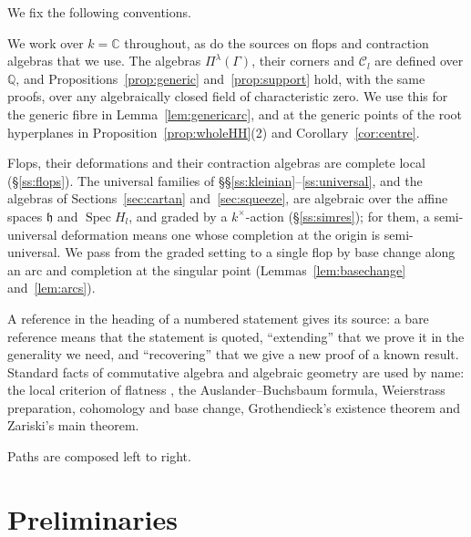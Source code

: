 \documentclass[11pt]{amsart}
\makeatletter
\numberwithin{table}{section}
\numberwithin{figure}{section}
\numberwithin{equation}{section}
\theoremstyle{definition}
\theoremstyle{plain}
\newcommand{\cC}{\mathcal{C}}
\newcommand{\h}{\mathfrak{h}}
\newcommand{\Q}{\mathbb{Q}}
\newcommand{\C}{\mathbb{C}}
\DeclareMathOperator{\Spec}{Spec}
\renewcommand\paragraph{\@startsection{paragraph}{4}{\z@}{\medskipamount}{-.5em}{\normalfont\bfseries}}
\makeatother
\begin{document}
\paragraph{Conventions.} We fix the following conventions.
\begin{description}[leftmargin=0pt, itemsep=3pt, font=\normalfont\itshape]
\item[Base field] We work over $k = \C$ throughout, as do the sources on flops and contraction algebras that we use. The algebras $\Pi^\lambda(\Gamma)$, their corners and $\cC_l$ are defined over $\Q$, and Propositions~\ref{prop:generic} and~\ref{prop:support} hold, with the same proofs, over any algebraically closed field of characteristic zero. We use this for the generic fibre in Lemma~\ref{lem:genericarc}, and at the generic points of the root hyperplanes in Proposition~\ref{prop:wholeHH}(2) and Corollary~\ref{cor:centre}.
\item[Local and graded settings] Flops, their deformations and their contraction algebras are complete local (\S\ref{ss:flops}). The universal families of \S\S\ref{ss:kleinian}--\ref{ss:universal}, and the algebras of Sections~\ref{sec:cartan} and~\ref{sec:squeeze}, are algebraic over the affine spaces $\h$ and $\Spec H_l$, and graded by a $k^\times$-action (\S\ref{ss:simres}); for them, a semi-universal deformation means one whose completion at the origin is semi-universal. We pass from the graded setting to a single flop by base change along an arc and completion at the singular point (Lemmas~\ref{lem:basechange} and~\ref{lem:arcs}).
\item[References] A reference in the heading of a numbered statement gives its source: a bare reference means that the statement is quoted, ``extending'' that we prove it in the generality we need, and ``recovering'' that we give a new proof of a known result. Standard facts of commutative algebra and algebraic geometry are used by name: the local criterion of flatness \cite[Thm~22.3]{Mat}, the Auslander--Buchsbaum formula, Weierstrass preparation, cohomology and base change, Grothendieck's existence theorem and Zariski's main theorem.
\item[Quivers] Paths are composed left to right.
\end{description}

%
%
\section{Preliminaries}\label{sec:prelim}
\end{document}
